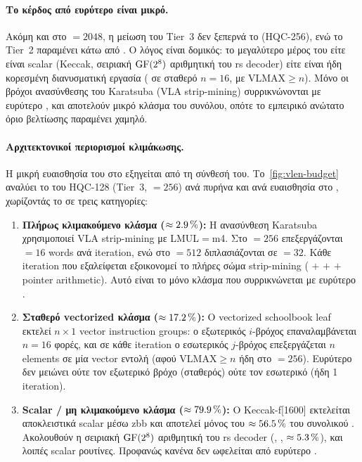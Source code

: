 \paragraph{Το κέρδος από ευρύτερο \VLEN είναι μικρό.}
Ακόμη και στο \VLEN$= \num{2048}$, η μείωση \instret του Tier~3 δεν
ξεπερνά το  (HQC-256), ενώ το Tier~2 παραμένει κάτω από
. Ο λόγος είναι δομικός: το μεγαλύτερο μέρος του \instret είτε
είναι scalar (Keccak, σειριακή $\mathrm{GF}(2^8)$ αριθμητική του
\gls{rs} decoder) είτε είναι ήδη κορεσμένη διανυσματική εργασία
( σε σταθερό $n = \num{16}$, με $\text{VLMAX} \geq n$). 
Μόνο οι βρόχοι ανασύνθεσης του Karatsuba (VLA strip-mining) συρρικνώνονται 
με ευρύτερο \VLEN, και αποτελούν μικρό κλάσμα του συνόλου, οπότε το εμπειρικό 
ανώτατο όριο βελτίωσης παραμένει χαμηλό.

\paragraph{Αρχιτεκτονικοί περιορισμοί κλιμάκωσης.}

Η μικρή ευαισθησία του \instret στο \VLEN εξηγείται από τη σύνθεσή του.
Το~\cref{fig:vlen-budget} αναλύει το \instret του HQC-128
(Tier~3, \VLEN$= \num{256}$) ανά πυρήνα και ανά ευαισθησία στο
\VLEN, χωρίζοντάς το σε τρεις κατηγορίες:
\begin{enumerate}

  \item \textbf{Πλήρως κλιμακούμενο κλάσμα ($\approx\SI{2.9}{\percent}$):} 
    Η ανασύνθεση Karatsuba χρησιμοποιεί VLA 
    strip-mining με LMUL$=$m4. Στο \VLEN$= \num{256}$
    επεξεργάζονται \VLMAX$= \num{16}$ words ανά iteration, ενώ στο
    \VLEN$= \num{512}$ διπλασιάζονται σε \VLMAX$= \num{32}$. Κάθε
    iteration που εξαλείφεται εξοικονομεί το πλήρες σώμα strip-mining
    ( $+$  $+$  $+$ pointer
    arithmetic). Αυτό είναι το μόνο κλάσμα που συρρικνώνεται με ευρύτερο \VLEN.

  \item \textbf{Σταθερό vectorized κλάσμα ($\approx\SI{17.2}{\percent}$):} 
  Ο vectorized schoolbook leaf εκτελεί $n \times 1$ vector instruction
  groups: ο εξωτερικός $i$-βρόχος επαναλαμβάνεται $n = \num{16}$ φορές, και
  σε κάθε iteration ο εσωτερικός $j$-βρόχος επεξεργάζεται $n$ elements σε
  μία vector εντολή (αφού $\text{VLMAX} \geq n$ ήδη στο \VLEN$= \num{256}$).
  Ευρύτερο \VLEN δεν μειώνει ούτε τον εξωτερικό βρόχο (σταθερός) ούτε τον
  εσωτερικό (ήδη 1 iteration).

  \item \textbf{Scalar / μη κλιμακούμενο κλάσμα ($\approx\SI{79.9}{\percent}$):} Ο
    Keccak-f[1600] εκτελείται αποκλειστικά scalar μέσω \gls{zbb}
    και αποτελεί μόνος του $\approx\SI{56.5}{\percent}$ του
    συνολικού \KEM. Ακολουθούν η σειριακή $\mathrm{GF}(2^8)$ αριθμητική του
    \gls{rs} decoder (, , $\approx\SI{5.3}{\percent}$),
    και λοιπές scalar ρουτίνες. Προφανώς κανένα δεν ωφελείται από ευρύτερο \VLEN.
\end{enumerate}

